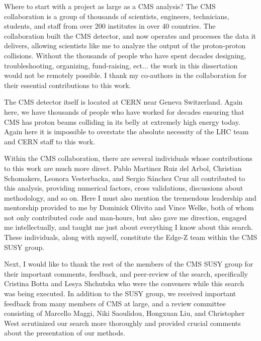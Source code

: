 \begin{frontmatter}
%
\tableofcontents
\listoffigures  %
\listoftables   %



%
%
\begin{acknowledgements}
Where to start with a project as large as a CMS analysis? The CMS collaboration is a group of thousands of scientists, engineers, technicians, students, and staff from over 200 institutes in over 40 countries. The collaboration built the CMS detector, and now operates and processes the data it delivers, allowing scientists like me to analyze the output of the proton-proton collisions. Without the thousands of people who have spent decades designing, troubleshooting, organizing, fund-raising, ect... the work in this dissertation would not be remotely possible. I thank my co-authors in the collaboration for their essential contributions to this work.

The CMS detector itself is located at CERN near Geneva Switzerland. Again here, we have thousands of people who have worked for decades ensuring that CMS has proton beams colliding in its belly at extremely high energy today. Again here it is impossible to overstate the absolute necessity of the LHC team and CERN staff to this work. 

Within the CMS collaboration, there are several individuals whose contributions to this work are much more direct. Pablo Martinez Ruiz del Arbol, Christian Schomakers, Leonora Vesterbacka, and Sergio Sánchez Cruz all contributed to this analysis, providing numerical factors, cross validations, discussions about methodology, and so on. Here I must also mention the tremendous leadership and mentorship provided to me by Dominick Olivito and Vince Welke, both of whom not only contributed code and man-hours, but also gave me direction, engaged me intellectually, and taught me just about everything I know about this search. These individuals, along with myself, constitute the Edge-Z team within the CMS SUSY group.

Next, I would like to thank the rest of the members of the CMS SUSY group for their important comments, feedback, and peer-review of the search, specifically Cristina Botta and Lesya Shchutska who were the conveners while this search was being executed. In addition to the SUSY group, we received important feedback from many members of CMS at large, and a review committee consisting of Marcello Maggi, Niki Saoulidou, Hongxuan Liu, and Christopher West scrutinized our search more thoroughly and provided crucial comments about the presentation of our methods.


\end{acknowledgements}
\end{frontmatter}
